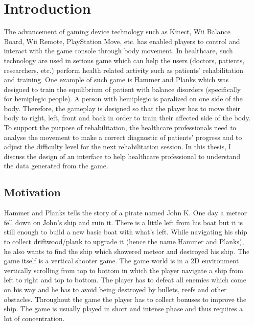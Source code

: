 \chapter{Introduction}
\label{chap:intro}

The advancement of gaming device technology such as Kinect, Wii Balance Board, Wii Remote, PlayStation Move, etc. has enabled players to control and interact with the game console through body movement. In healthcare, such technology are used in serious game which can help the users (doctors, patients, researchers, etc.)  perform health related activity such as patients' rehabilitation and training\cite{rahman,brezinka,green}. One example of such game is Hammer and Planks which was designed to train the equilibrium of patient with balance disorders (specifically for hemiplegic people)\cite{diloreto}. A person with hemiplegic is paralized on one side of the body. Therefore, the gameplay is designed so that the player has to move their body to right, left, front and back in order to train their affected side of the body. To support the purpose of rehabilitation, the healthcare professionals need to analyse the movement to  make a correct diagnostic of patients' progress and to adjust the difficulty level for the next rehabilitation session. In this thesis, I discuss the design of an interface to help healthcare professional to understand the data generated from the game.

\section{Motivation}

Hammer and Planks tells the story of a pirate named John K. One day a meteor fell down on John's ship and ruin it. There is a little left from his boat but it is still enough to build a new basic boat with what's left. While navigating his ship to collect driftwood/plank to upgrade it (hence the name Hammer and Planks), he also wants to find the ship which showered meteor and destroyed his ship. The game itself is a vertical shooter game. The game world is in a 2D environment vertically scrolling from top to bottom in which the player navigate a ship from left to right and top to bottom. The player has to defeat all enemies which come on his way and he has to avoid being destroyed by bullets, reefs and other obstacles. Throughout the game the player has to collect bonuses to improve the ship. The game is usually played in short and intense phase and thus requires a lot of concentration\cite{diloreto}.

